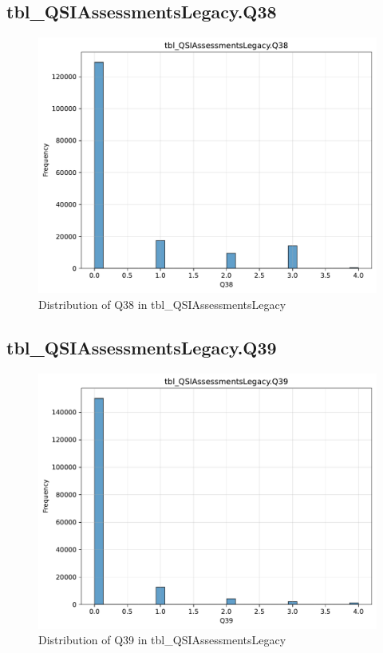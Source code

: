 \subsection{tbl\_QSIAssessmentsLegacy.Q38}

\begin{figure}[htbp]
\centering
\includegraphics[width=\textwidth]{figures/dbo_tbl_QSIAssessmentsLegacy_Q38.pdf}
\caption{Distribution of Q38 in tbl\_QSIAssessmentsLegacy}
\end{figure}\newpage

\subsection{tbl\_QSIAssessmentsLegacy.Q39}

\begin{figure}[htbp]
\centering
\includegraphics[width=\textwidth]{figures/dbo_tbl_QSIAssessmentsLegacy_Q39.pdf}
\caption{Distribution of Q39 in tbl\_QSIAssessmentsLegacy}
\end{figure}\newpage

